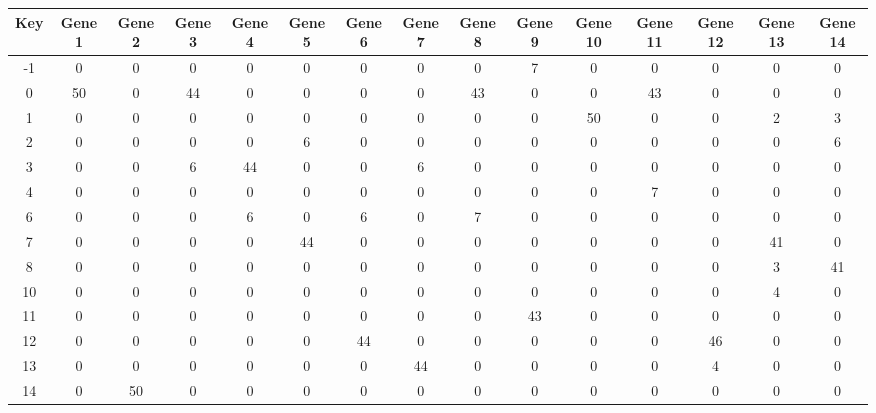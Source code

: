 \begin{tabular}{|c|c|c|c|c|c|c|c|c|c|c|c|c|c|c|}
\hline
Key & Gene 1 & Gene 2 & Gene 3 & Gene 4 & Gene 5 & Gene 6 & Gene 7 & Gene 8 & Gene 9 & Gene 10 & Gene 11 & Gene 12 & Gene 13 & Gene 14 \\
\hline
-1 & 0 & 0 & 0 & 0 & 0 & 0 & 0 & 0 & 7 & 0 & 0 & 0 & 0 & 0 \\
0 & 50 & 0 & 44 & 0 & 0 & 0 & 0 & 43 & 0 & 0 & 43 & 0 & 0 & 0 \\
1 & 0 & 0 & 0 & 0 & 0 & 0 & 0 & 0 & 0 & 50 & 0 & 0 & 2 & 3 \\
2 & 0 & 0 & 0 & 0 & 6 & 0 & 0 & 0 & 0 & 0 & 0 & 0 & 0 & 6 \\
3 & 0 & 0 & 6 & 44 & 0 & 0 & 6 & 0 & 0 & 0 & 0 & 0 & 0 & 0 \\
4 & 0 & 0 & 0 & 0 & 0 & 0 & 0 & 0 & 0 & 0 & 7 & 0 & 0 & 0 \\
6 & 0 & 0 & 0 & 6 & 0 & 6 & 0 & 7 & 0 & 0 & 0 & 0 & 0 & 0 \\
7 & 0 & 0 & 0 & 0 & 44 & 0 & 0 & 0 & 0 & 0 & 0 & 0 & 41 & 0 \\
8 & 0 & 0 & 0 & 0 & 0 & 0 & 0 & 0 & 0 & 0 & 0 & 0 & 3 & 41 \\
10 & 0 & 0 & 0 & 0 & 0 & 0 & 0 & 0 & 0 & 0 & 0 & 0 & 4 & 0 \\
11 & 0 & 0 & 0 & 0 & 0 & 0 & 0 & 0 & 43 & 0 & 0 & 0 & 0 & 0 \\
12 & 0 & 0 & 0 & 0 & 0 & 44 & 0 & 0 & 0 & 0 & 0 & 46 & 0 & 0 \\
13 & 0 & 0 & 0 & 0 & 0 & 0 & 44 & 0 & 0 & 0 & 0 & 4 & 0 & 0 \\
14 & 0 & 50 & 0 & 0 & 0 & 0 & 0 & 0 & 0 & 0 & 0 & 0 & 0 & 0 \\
\hline
\end{tabular}